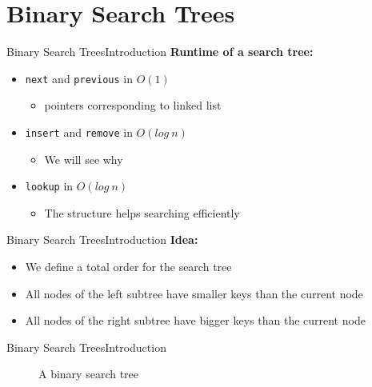 \section{Binary Search Trees}

\begin{frame}{Binary Search Trees}{Introduction}
  \textbf{Runtime of a search tree:}
  \begin{itemize}
  \item<3-> {\color{Mittel-Blau}\texttt{next}} and {\color{Mittel-Blau}\texttt{previous}} in $O(1)$
    \begin{itemize}
    \item<4-> pointers corresponding to linked list
    \end{itemize}
  \item<5-> {\color{Mittel-Blau}\texttt{insert}} and {\color{Mittel-Blau}\texttt{remove}} in $O(log~n)$
    \begin{itemize}
    \item<6-> We will see why
    \end{itemize}
  \item<7-> {\color{Mittel-Blau}\texttt{lookup}} in $O(log~n)$
    \begin{itemize}
    \item<8-> The structure helps searching efficiently
    \end{itemize}
  \end{itemize}
\end{frame}


\begin{frame}{Binary Search Trees}{Introduction}
  \textbf{Idea:}
  \begin{itemize}
    \item<2->
      We define a total order for the search tree
    \item<3->
      All nodes of the left subtree have {\color{Mittel-Blau}smaller keys}
      than the current node
    \item<4->
      All nodes of the right subtree have {\color{Mittel-Blau}bigger keys}
      than the current node
  \end{itemize}
\end{frame}


\begin{frame}{Binary Search Trees}{Introduction}
  \begin{figure}
    
    \caption{A binary search tree}
    \label{fig:binary_search_trees:binary_tree_example1}
  \end{figure}
\end{frame}

